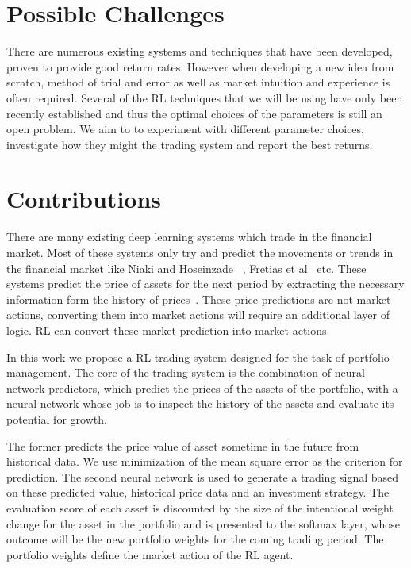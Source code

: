 \section{Possible Challenges}

There are numerous existing systems and techniques that have been developed, proven to provide good return rates. However when developing a new idea from scratch, method of trial and error as well as market intuition and experience is often required. Several of the RL techniques that we will be using have only been recently established and thus the optimal choices of the parameters is still an open problem. We aim to to experiment with different parameter choices, investigate how they might the trading system and report the best returns.

\section{Contributions}

There are many existing deep learning systems which trade in the financial market. Most of these systems only try and predict the movements or trends in the financial market like Niaki and Hoseinzade ~\cite{niaki2013forecasting}, Fretias et al~\cite{freitas2009prediction} etc. These systems predict the price of assets for the next period by extracting the necessary information form the history of prices~\cite{jiang2017deep}. These price predictions are not market actions, converting them into market actions will require an additional layer of logic. RL can convert these market prediction into market actions.

In this work we propose a RL trading system designed for the task of portfolio management. The core of the trading system is the combination of neural network predictors, which predict the prices of the assets of the portfolio, with a neural network whose job is to inspect the history of the assets and evaluate its potential for growth. 

The former predicts the price value of asset sometime in the future from historical data. We use minimization of the mean square error as the criterion for prediction. The second neural network is used to generate a trading signal based on these predicted value, historical price data and an investment strategy. The  evaluation score of each asset is discounted by the size of the intentional weight change for the asset in the portfolio and is presented to the softmax layer, whose outcome will be the new portfolio weights for the coming trading period. The portfolio weights define the market action of the RL agent.
